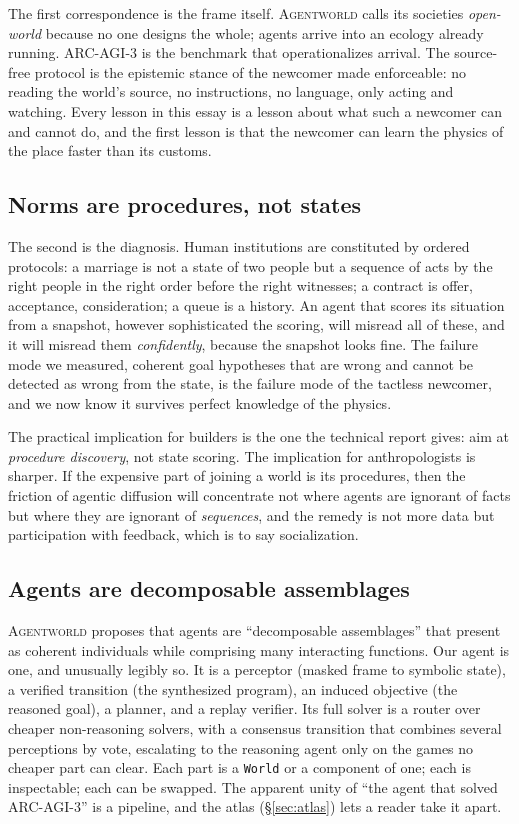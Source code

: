 \documentclass[11pt]{article}
\newcommand{\agentworld}{\textsc{Agentworld}}
\begin{document}
The first correspondence is the frame itself. \agentworld{} calls its societies \emph{open-world} because
no one designs the whole; agents arrive into an ecology already running. ARC-AGI-3 is the benchmark that
operationalizes arrival. The source-free protocol is the epistemic stance of the newcomer made
enforceable: no reading the world's source, no instructions, no language, only acting and watching. Every
lesson in this essay is a lesson about what such a newcomer can and cannot do, and the first lesson is
that the newcomer can learn the physics of the place faster than its customs.

\subsection{Norms are procedures, not states}

The second is the diagnosis. Human institutions are constituted by ordered protocols: a marriage is not a
state of two people but a sequence of acts by the right people in the right order before the right
witnesses; a contract is offer, acceptance, consideration; a queue is a history. An agent that scores its
situation from a snapshot, however sophisticated the scoring, will misread all of these, and it will
misread them \emph{confidently}, because the snapshot looks fine. The failure mode we measured, coherent
goal hypotheses that are wrong and cannot be detected as wrong from the state, is the failure mode of the
tactless newcomer, and we now know it survives perfect knowledge of the physics.

The practical implication for builders is the one the technical report gives: aim at \emph{procedure
discovery}, not state scoring. The implication for anthropologists is sharper. If the expensive part of
joining a world is its procedures, then the friction of agentic diffusion will concentrate not where
agents are ignorant of facts but where they are ignorant of \emph{sequences}, and the remedy is not more
data but participation with feedback, which is to say socialization.

\subsection{Agents are decomposable assemblages}

\agentworld{} proposes that agents are ``decomposable assemblages'' that present as coherent individuals
while comprising many interacting functions. Our agent is one, and unusually legibly so. It is a
perceptor (masked frame to symbolic state), a verified transition (the synthesized program), an induced
objective (the reasoned goal), a planner, and a replay verifier. Its full solver is a router over cheaper
non-reasoning solvers, with a consensus transition that combines several perceptions by vote, escalating to
the reasoning agent only on the games no cheaper part can clear. Each part is a \texttt{World} or a
component of one; each is inspectable; each can be swapped. The apparent unity of ``the agent that solved
ARC-AGI-3'' is a pipeline, and the atlas (\S\ref{sec:atlas}) lets a reader take it apart.
\end{document}
